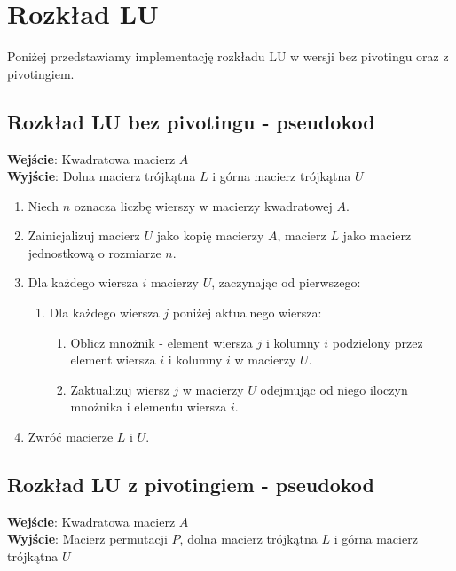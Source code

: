 \documentclass[a4paper]{article}
\begin{document}
\section{Rozkład LU}
Poniżej przedstawiamy implementację rozkładu LU w wersji bez pivotingu oraz z pivotingiem.

\subsection{Rozkład LU bez pivotingu - pseudokod}

\textbf{Wejście}: Kwadratowa macierz \(A\) \\
\textbf{Wyjście}: Dolna macierz trójkątna \(L\) i górna macierz trójkątna \(U\)

\begin{enumerate}
    \item Niech \(n\) oznacza liczbę wierszy w macierzy kwadratowej \(A\).
    \item Zainicjalizuj macierz \(U\) jako kopię macierzy \(A\), macierz \(L\) jako macierz jednostkową o rozmiarze \(n\).
    \item Dla każdego wiersza \(i\) macierzy \(U\), zaczynając od pierwszego:
    \begin{enumerate}
        \item Dla każdego wiersza \(j\) poniżej aktualnego wiersza:
        \begin{enumerate}
            \item Oblicz mnożnik - element wiersza \(j\) i kolumny \(i\) podzielony przez element wiersza \(i\) i kolumny \(i\) w macierzy \(U\).
            \item Zaktualizuj wiersz \(j\) w macierzy \(U\) odejmując od niego iloczyn mnożnika i elementu wiersza \(i\).
        \end{enumerate}
    \end{enumerate}
    \item Zwróć macierze \(L\) i \(U\).
\end{enumerate}

\subsection{Rozkład LU z pivotingiem - pseudokod}

\textbf{Wejście}: Kwadratowa macierz \(A\) \\
\textbf{Wyjście}: Macierz permutacji \(P\), dolna macierz trójkątna \(L\) i górna macierz trójkątna \(U\)
\end{document}
